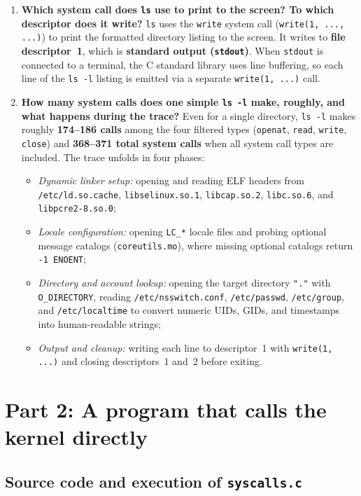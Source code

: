 \documentclass{../latex/utmreport}
\providecommand{\tightlist}{\setlength{\itemsep}{0pt}\setlength{\parskip}{0pt}}
\begin{document}
\begin{enumerate}
\tightlist
\item \textbf{Which system call does \texttt{ls} use to print to the screen? To which descriptor does it write?}
\texttt{ls} uses the \texttt{write} system call (\texttt{write(1, ..., ...)}) to print the formatted directory listing to the screen. It writes to \textbf{file descriptor~1}, which is \textbf{standard output (\texttt{stdout})}. When \texttt{stdout} is connected to a terminal, the C standard library uses line buffering, so each line of the \texttt{ls -l} listing is emitted via a separate \texttt{write(1, ...)} call.
\item \textbf{How many system calls does one simple \texttt{ls -l} make, roughly, and what happens during the trace?}
Even for a single directory, \texttt{ls -l} makes roughly \textbf{174--186 calls} among the four filtered types (\texttt{openat}, \texttt{read}, \texttt{write}, \texttt{close}) and \textbf{368--371 total system calls} when all system call types are included. The trace unfolds in four phases:
\begin{itemize}
\tightlist
\item \emph{Dynamic linker setup:} opening and reading ELF headers from \texttt{/etc/ld.so.cache}, \texttt{libselinux.so.1}, \texttt{libcap.so.2}, \texttt{libc.so.6}, and \texttt{libpcre2-8.so.0};
\item \emph{Locale configuration:} opening \texttt{LC\_*} locale files and probing optional message catalogs (\texttt{coreutils.mo}), where missing optional catalogs return \texttt{-1 ENOENT};
\item \emph{Directory and account lookup:} opening the target directory \texttt{"."} with \texttt{O\_DIRECTORY}, reading \texttt{/etc/nsswitch.conf}, \texttt{/etc/passwd}, \texttt{/etc/group}, and \texttt{/etc/localtime} to convert numeric UIDs, GIDs, and timestamps into human-readable strings;
\item \emph{Output and cleanup:} writing each line to descriptor~1 with \texttt{write(1, ...)} and closing descriptors~1 and~2 before exiting.
\end{itemize}
\end{enumerate}

\chapter{Part 2: A program that calls the kernel directly}

\section{Source code and execution of \texttt{syscalls.c}}
\end{document}
